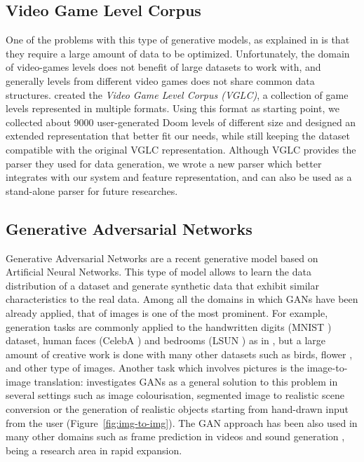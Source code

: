 \subsection{Video Game Level Corpus}
One of the problems with this type of generative models, as explained in \cite{PCGML} is that they require a large amount of data to be optimized. Unfortunately, the domain of video-games levels does not benefit of large datasets to work with, and generally levels from different video games does not share common data structures. \citeauthor{VGLC} created the \textit{Video Game Level Corpus (VGLC)}, a collection of game levels represented in multiple formats. Using this format as starting point, we collected about 9000 user-generated Doom levels of different size and designed an extended representation that better fit our needs, while still keeping the dataset compatible with the original VGLC representation. Although VGLC provides the parser they used for data generation, we wrote a new parser which better integrates with our system and feature representation, and can also be used as a stand-alone parser for future researches.

\subsection{Generative Adversarial Networks}
Generative Adversarial Networks are a recent generative model based on Artificial Neural Networks. This type of model allows to learn the data distribution of a dataset and generate synthetic data that exhibit similar characteristics to the real data. Among all the domains in which GANs have been already applied, that of images is one of the most prominent. For example, generation tasks are commonly applied to the handwritten digits (MNIST \cite{dataset:MNIST}) dataset, human faces (CelebA \cite{dataset:celebA}) and bedrooms (LSUN \cite{dataset:LSUN}) as in \cite{gan:dcgan}, but a large amount of creative work is done with many other datasets such as birds, flower \cite{gan:birds}, and other type of images. Another task which involves pictures is the image-to-image translation: \citeauthor{image-to-image} investigates GANs as a general solution to this problem in several settings \cite{image-to-image} such as image colourisation, segmented image to realistic scene conversion or  the generation of realistic objects starting from hand-drawn input from the user (Figure~\ref{fig:img-to-img}). The GAN approach has been also used in many other domains such as frame prediction in videos \cite{gan:frameprediction} and sound generation \cite{gan:sound}, being a research area in rapid expansion.

